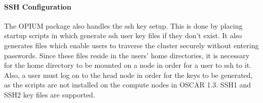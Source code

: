 \paragraph{SSH Configuration}
The OPIUM package also handles the ssh key setup.  This is done by placing
startup scripts in  which generate ssh user key files if 
they don't exist.  It also generates  files which enable
users to traverse the cluster securely without entering passwords.  Since
these files reside in the users' home directories, it is necessary for
the home directory to be mounted on a node in order for a user to ssh to
it.  Also, a user must log on to the head node in order for the keys to
be generated, as the  scripts are not installed on the
compute nodes in OSCAR 1.3.  SSH1 and SSH2 key files are supported.  


